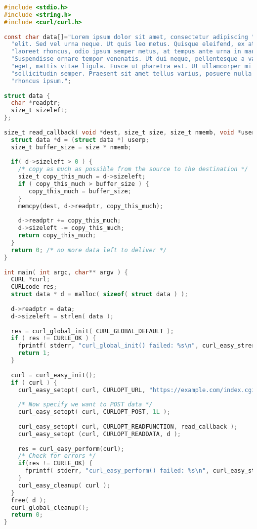 \begin{lstlisting}[language=C]
#include <stdio.h>
#include <string.h>
#include <curl/curl.h>
  
const char data[]="Lorem ipsum dolor sit amet, consectetur adipiscing "
  "elit. Sed vel urna neque. Ut quis leo metus. Quisque eleifend, ex at "
  "laoreet rhoncus, odio ipsum semper metus, at tempus ante urna in mauris. "
  "Suspendisse ornare tempor venenatis. Ut dui neque, pellentesque a varius "
  "eget, mattis vitae ligula. Fusce ut pharetra est. Ut ullamcorper mi ac "
  "sollicitudin semper. Praesent sit amet tellus varius, posuere nulla non, "
  "rhoncus ipsum.";
 
struct data {
  char *readptr;
  size_t sizeleft;
};
 
size_t read_callback( void *dest, size_t size, size_t nmemb, void *userp ) {
  struct data *d = (struct data *) userp;
  size_t buffer_size = size * nmemb;
 
  if( d->sizeleft > 0 ) {
    /* copy as much as possible from the source to the destination */ 
    size_t copy_this_much = d->sizeleft;
    if ( copy_this_much > buffer_size ) {
       copy_this_much = buffer_size;
    }
    memcpy(dest, d->readptr, copy_this_much);
 
    d->readptr += copy_this_much;
    d->sizeleft -= copy_this_much;
    return copy_this_much; 
  }
  return 0; /* no more data left to deliver */ 
}
 
int main( int argc, char** argv ) {
  CURL *curl;
  CURLcode res;
  struct data * d = malloc( sizeof( struct data ) );
 
  d->readptr = data;
  d->sizeleft = strlen( data );
 
  res = curl_global_init( CURL_GLOBAL_DEFAULT );
  if ( res != CURLE_OK ) {
    fprintf( stderr, "curl_global_init() failed: %s\n", curl_easy_strerror( res ) );
    return 1;
  }
 
  curl = curl_easy_init();
  if ( curl ) {
    curl_easy_setopt( curl, CURLOPT_URL, "https://example.com/index.cgi" );
 
    /* Now specify we want to POST data */ 
    curl_easy_setopt( curl, CURLOPT_POST, 1L );
 
    curl_easy_setopt( curl, CURLOPT_READFUNCTION, read_callback );
    curl_easy_setopt (curl, CURLOPT_READDATA, d );
 
    res = curl_easy_perform(curl);
    /* Check for errors */ 
    if(res != CURLE_OK) {
      fprintf( stderr, "curl_easy_perform() failed: %s\n", curl_easy_strerror( res ) );
    }  
    curl_easy_cleanup( curl );
  }
  free( d );
  curl_global_cleanup();
  return 0;
}
\end{lstlisting}

